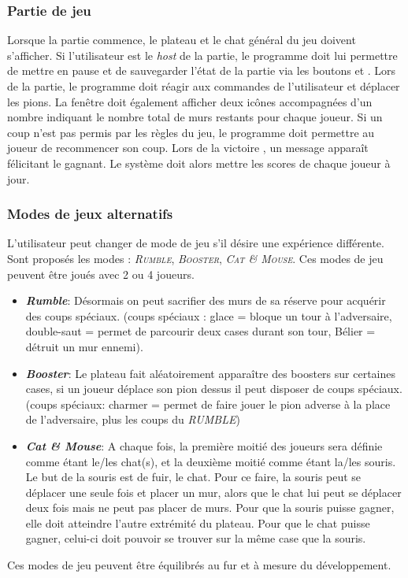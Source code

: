 \documentclass[a4paper,10pt]{article}
\newcommand{\button}[1]{
    \fbox{\textsc{#1}}}
\begin{document}
\subsubsection{Partie de jeu}
Lorsque la partie commence, le plateau et le chat général du jeu doivent s'afficher.
Si l'utilisateur est le \textit{host} de la partie, le programme doit lui permettre de mettre en pause et de sauvegarder l'état de la partie via les boutons \button{pause} et \button{save	}.
Lors de la partie, le programme doit réagir aux commandes de l'utilisateur et déplacer les pions.
La fenêtre doit également afficher deux icônes accompagnées d'un nombre indiquant le nombre total de murs restants pour chaque joueur.
Si un coup n'est pas permis par les règles du jeu, le programme doit permettre au joueur de recommencer son coup.
Lors de la victoire , un message apparaît félicitant le gagnant. Le système doit alors mettre les scores de chaque joueur à jour.

\subsubsection{Modes de jeux alternatifs}
L'utilisateur peut changer de mode de jeu s'il désire une expérience différente.
Sont proposés les modes : \textit{\textsc{Rumble}}, \textit{\textsc{Booster}}, \textit{\textsc{Cat \& Mouse}}. Ces modes de jeu peuvent être joués avec 2 ou 4 joueurs.
\\
\begin{itemize}
	\item \textit{\textbf{Rumble}}: Désormais on peut sacrifier des murs de sa réserve pour acquérir des coups spéciaux. (coups spéciaux : glace = bloque un tour à l'adversaire, double-saut = permet de parcourir deux cases durant son tour, Bélier = détruit un mur ennemi).
	\item \textit{\textbf{Booster}}: Le plateau fait aléatoirement apparaître des boosters sur certaines cases, si un joueur déplace son pion dessus il peut disposer de coups spéciaux.(coups spéciaux: charmer = permet de faire jouer le pion adverse à la place de l'adversaire, plus les coups du \textit{RUMBLE})
	\item \textit{\textbf{Cat \& Mouse}}: A chaque fois, la première moitié des joueurs sera définie comme étant le/les chat(s), et la deuxième moitié comme étant la/les souris. Le but de la souris est de fuir, le chat. Pour ce faire, la souris peut se déplacer une seule fois et placer un mur, alors que le chat lui peut se déplacer deux fois mais ne peut pas placer de murs. Pour que la souris puisse gagner, elle doit atteindre l'autre extrémité du plateau. Pour que le chat puisse gagner, celui-ci doit pouvoir se trouver sur la même case que la souris.
\end{itemize}
Ces modes de jeu peuvent être équilibrés au fur et à mesure du développement.
\end{document}
